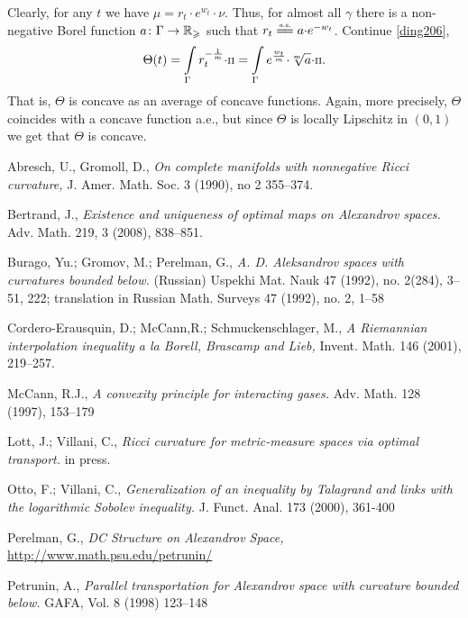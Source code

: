 \documentclass[oneside,a4paper]{article}
\begin{document}
Clearly, for any $t$ we have
$\mu=r_t{\cdot} e^{w_t}{\cdot}\nu$.
Thus, for almost all $\gamma$ there is a non-negative Borel function $a\colon\Gamma\to\mathbb{R}_\geqslant$ such that $r_t\ae a {\cdot}e^{-w_t}$.
Continue \ref{ding206},
$$\Theta(t)
=
\int\limits_\Gamma r_t^{-\frac1m}{\cdot}\text{\scriptsize $\Pi$}
=
\int\limits_\Gamma{e^{\frac{w_t}m}}{\cdot}{\sqrt[m]{a}}{\cdot}\text{\scriptsize $\Pi$}.
$$
That is, $\Theta$ is concave as an average of concave functions.
Again, more precisely, $\Theta$ coincides with a concave function a.e., but since $\Theta$ is locally Lipschitz in $(0,1)$ we get that $\Theta$ is concave. \qeds




\begin{thebibliography}{3} 
 Abresch, U., Gromoll, D., \textit{On complete manifolds with nonnegative Ricci curvature,} J. Amer. Math. Soc. 3 (1990), no 2 355--374.

Bertrand, J., \textit{Existence and uniqueness of optimal maps on Alexandrov spaces.}
Adv. Math. 219, 3 (2008), 838--851.

 Burago, Yu.; Gromov, M.; Perelman, G., \textit{A. D. Aleksandrov spaces
with curvatures bounded below.} (Russian)  Uspekhi Mat. Nauk  47  (1992),  no.
2(284), 3--51, 222;  translation in  Russian Math. Surveys  47  (1992),  no. 2, 1--58

 Cordero-Erausquin, D.; McCann,R.;  Schmuckenschlager, M., \textit{A Riemannian interpolation inequality a la Borell, Brascamp and Lieb,} Invent. Math. 146 (2001), 219--257.

 McCann, R.J., \textit{A convexity principle for interacting gases.}
Adv. Math. 128 (1997), 153--179

 Lott, J.; Villani, C., \textit{Ricci curvature for metric-measure spaces via optimal transport.} in press.

 Otto, F.;  Villani, C., \textit{Generalization of an inequality by Talagrand and links
with the logarithmic Sobolev inequality.}
J. Funct. Anal. 173 (2000), 361-400


 Perelman, G., \textit{DC Structure on Alexandrov Space,}\\ \href{http://www.math.psu.edu/petrunin/papers/papers.html}{http://www.math.psu.edu/petrunin/}

 Petrunin, A., \textit{Parallel transportation for Alexandrov space with curvature bounded below.}  GAFA, Vol. 8 (1998) 123--148


\end{thebibliography}
\end{document}
